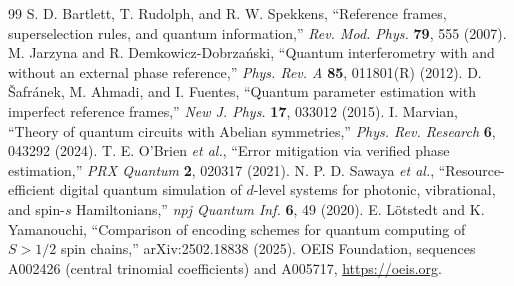 \documentclass[11pt,a4paper]{article}
\begin{document}
\begin{thebibliography}{99}
 S. D. Bartlett, T. Rudolph, and R. W. Spekkens, ``Reference frames, superselection rules, and quantum information,'' \emph{Rev. Mod. Phys.} \textbf{79}, 555 (2007).
 M. Jarzyna and R. Demkowicz-Dobrza\'nski, ``Quantum interferometry with and without an external phase reference,'' \emph{Phys. Rev. A} \textbf{85}, 011801(R) (2012).
 D. \v{S}afr\'anek, M. Ahmadi, and I. Fuentes, ``Quantum parameter estimation with imperfect reference frames,'' \emph{New J. Phys.} \textbf{17}, 033012 (2015).
 I. Marvian, ``Theory of quantum circuits with Abelian symmetries,'' \emph{Phys. Rev. Research} \textbf{6}, 043292 (2024).
 T. E. O'Brien \emph{et al.}, ``Error mitigation via verified phase estimation,'' \emph{PRX Quantum} \textbf{2}, 020317 (2021).
 N. P. D. Sawaya \emph{et al.}, ``Resource-efficient digital quantum simulation of $d$-level systems for photonic, vibrational, and spin-$s$ Hamiltonians,'' \emph{npj Quantum Inf.} \textbf{6}, 49 (2020).
 E. L\"otstedt and K. Yamanouchi, ``Comparison of encoding schemes for quantum computing of $S>1/2$ spin chains,'' arXiv:2502.18838 (2025).
 OEIS Foundation, sequences A002426 (central trinomial coefficients) and A005717, \url{https://oeis.org}.
\end{thebibliography}
\end{document}
